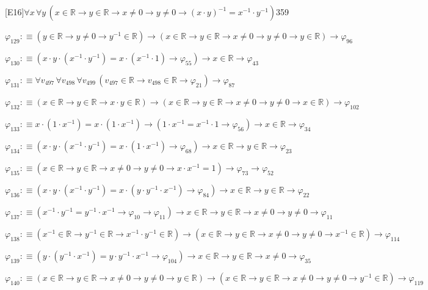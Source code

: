 \begin{fullproof}{[E16]}{$\forall x\,\forall y\,(x \in \mathbb{R} \to y \in \mathbb{R} \to x \neq 0 \to y \neq 0 \to (x \cdot y)^{-1} = x^{-1} \cdot y^{-1})$}{359}
\begin{abbrevlist}
\item $\varphi_{129} :\equiv (y \in \mathbb{R} \to y \neq 0 \to y^{-1} \in \mathbb{R}) \to (x \in \mathbb{R} \to y \in \mathbb{R} \to x \neq 0 \to y \neq 0 \to y \in \mathbb{R}) \to \varphi_{96}$
\item $\varphi_{130} :\equiv (x \cdot y \cdot (x^{-1} \cdot y^{-1}) = x \cdot (x^{-1} \cdot 1) \to \varphi_{55}) \to x \in \mathbb{R} \to \varphi_{43}$
\item $\varphi_{131} :\equiv \forall v_{497}\,\forall v_{498}\,\forall v_{499}\,(v_{497} \in \mathbb{R} \to v_{498} \in \mathbb{R} \to \varphi_{21}) \to \varphi_{87}$
\item $\varphi_{132} :\equiv (x \in \mathbb{R} \to y \in \mathbb{R} \to x \cdot y \in \mathbb{R}) \to (x \in \mathbb{R} \to y \in \mathbb{R} \to x \neq 0 \to y \neq 0 \to x \in \mathbb{R}) \to \varphi_{102}$
\item $\varphi_{133} :\equiv x \cdot (1 \cdot x^{-1}) = x \cdot (1 \cdot x^{-1}) \to (1 \cdot x^{-1} = x^{-1} \cdot 1 \to \varphi_{56}) \to x \in \mathbb{R} \to \varphi_{34}$
\item $\varphi_{134} :\equiv (x \cdot y \cdot (x^{-1} \cdot y^{-1}) = x \cdot (1 \cdot x^{-1}) \to \varphi_{68}) \to x \in \mathbb{R} \to y \in \mathbb{R} \to \varphi_{23}$
\item $\varphi_{135} :\equiv (x \in \mathbb{R} \to y \in \mathbb{R} \to x \neq 0 \to y \neq 0 \to x \cdot x^{-1} = 1) \to \varphi_{73} \to \varphi_{52}$
\item $\varphi_{136} :\equiv (x \cdot y \cdot (x^{-1} \cdot y^{-1}) = x \cdot (y \cdot y^{-1} \cdot x^{-1}) \to \varphi_{84}) \to x \in \mathbb{R} \to y \in \mathbb{R} \to \varphi_{22}$
\item $\varphi_{137} :\equiv (x^{-1} \cdot y^{-1} = y^{-1} \cdot x^{-1} \to \varphi_{10} \to \varphi_{11}) \to x \in \mathbb{R} \to y \in \mathbb{R} \to x \neq 0 \to y \neq 0 \to \varphi_{11}$
\item $\varphi_{138} :\equiv (x^{-1} \in \mathbb{R} \to y^{-1} \in \mathbb{R} \to x^{-1} \cdot y^{-1} \in \mathbb{R}) \to (x \in \mathbb{R} \to y \in \mathbb{R} \to x \neq 0 \to y \neq 0 \to x^{-1} \in \mathbb{R}) \to \varphi_{114}$
\item $\varphi_{139} :\equiv (y \cdot (y^{-1} \cdot x^{-1}) = y \cdot y^{-1} \cdot x^{-1} \to \varphi_{104}) \to x \in \mathbb{R} \to y \in \mathbb{R} \to x \neq 0 \to \varphi_{35}$
\item $\varphi_{140} :\equiv (x \in \mathbb{R} \to y \in \mathbb{R} \to x \neq 0 \to y \neq 0 \to y \in \mathbb{R}) \to (x \in \mathbb{R} \to y \in \mathbb{R} \to x \neq 0 \to y \neq 0 \to y^{-1} \in \mathbb{R}) \to \varphi_{119}$

\end{abbrevlist}
\end{fullproof}
